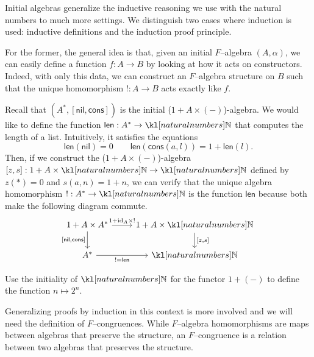 \documentclass[main.tex]{subfiles}
\begin{document}
Initial algebras generalize the inductive reasoning we use with the natural numbers to much more settings. We distinguish two cases where induction is used: inductive definitions and the induction proof principle. 

For the former, the general idea is that, given an initial $F$--algebra $(A,\alpha)$, we can easily define a function $f:A\rightarrow B$ by looking at how it acts on constructors. Indeed, with only this data, we can construct an $F$--algebra structure on $B$ such that the unique homomorphism $!:A\rightarrow B$ acts exactly like $f$.
\begin{exmp}
	Recall that $(A^*, [\textsf{nil}, \textsf{cons}])$ is the initial ($1+A\times(-)$)-algebra. We would like to define the function $\textsf{len}:A^* \rightarrow \N$ that computes the length of a list. Intuitively, it satisfies the equations \[\textsf{len}(\textsf{nil}) = 0 \quad \quad \textsf{len}(\textsf{cons}(a,l)) = 1+\textsf{len}(l).\]
	Then, if we construct the ($1+A\times(-)$)-algebra $[z, s]:1+ A\times \N \rightarrow \N$ defined by $z(\ast) = 0$ and $s(a,n) = 1+n$, we can verify that the unique algebra homomorphism $!:A^*\rightarrow \N$ is the function $\textsf{len}$ because both make the following diagram commute.
	\begin{equation}\label{diag-lendef}
	\centering
		\begin{tikzcd}
			1+A\times A^* \arrow[d, "{[\textsf{nil}, \textsf{cons}]}"'] \arrow[r, "1+\text{id}_A\times !"] & 1+A\times \N \arrow[d, "{[z,s]}"] \\
			A^* \arrow[r, "!=\textsf{len}"']                                                                            & \N                               
		\end{tikzcd}
	\end{equation}
\end{exmp}
\begin{exer}[1pt]
    Use the initiality of $\N$ for the functor $1+(-)$ to define the function $n \mapsto 2^n$.
\end{exer}
Generalizing proofs by induction in this context is more involved and we will need the definition of $F$--congruences. While $F$--algebra homomorphisms are maps between algebras that preserve the structure, an $F$--congruence is a relation between two algebras that preserves the structure.
\end{document}
